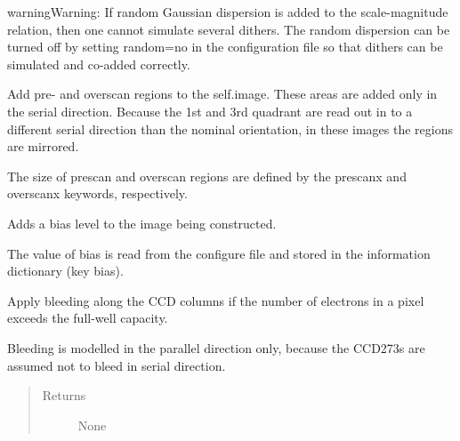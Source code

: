 \documentclass[a4paper,11pt,english]{sphinxmanual}
\begin{document}
\begin{fulllineitems}
\begin{fulllineitems}
\begin{notice}{warning}{Warning:}
If random Gaussian dispersion is added to the scale-magnitude relation, then one cannot
simulate several dithers. The random dispersion can be turned off by setting random=no in
the configuration file so that dithers can be simulated and co-added correctly.
\end{notice}

\end{fulllineitems}


\begin{fulllineitems}
\label{simulator:simulator.simulator.VISsimulator.addPreOverScans}
Add pre- and overscan regions to the self.image. These areas are added only in the serial direction.
Because the 1st and 3rd quadrant are read out in to a different serial direction than the nominal
orientation, in these images the regions are mirrored.

The size of prescan and overscan regions are defined by the prescanx and overscanx keywords, respectively.

\end{fulllineitems}


\begin{fulllineitems}
\label{simulator:simulator.simulator.VISsimulator.applyBias}
Adds a bias level to the image being constructed.

The value of bias is read from the configure file and stored
in the information dictionary (key bias).

\end{fulllineitems}


\begin{fulllineitems}
\label{simulator:simulator.simulator.VISsimulator.applyBleeding}
Apply bleeding along the CCD columns if the number of electrons in a pixel exceeds the full-well capacity.

Bleeding is modelled in the parallel direction only, because the CCD273s are assumed not to bleed in
serial direction.
\begin{quote}\begin{description}
\item[{Returns}] \leavevmode
None


\end{description}
\end{quote}
\end{fulllineitems}
\end{fulllineitems}
\end{document}

